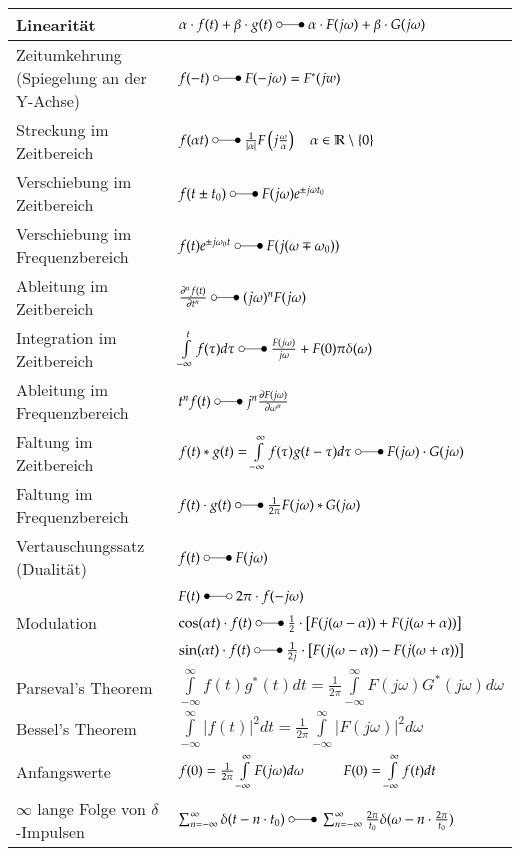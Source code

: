\begin{tabular}{|l|l|}
	\hline
	Linearität & 
	$\alpha\cdot f(t) + \beta\cdot g(t) \;\laplace\;\alpha\cdot F(j\omega) +
	\beta\cdot G(j\omega)$\\
	\hline
	Zeitumkehrung (Spiegelung an der Y-Achse)&
	$f(-t) \;\laplace\; F(-j\omega) = F^*(jw)$ \\
	\hline        	
	Streckung im Zeitbereich &
	$f(\alpha t) \;\laplace\; \frac{1}{|\alpha|}F \left (j\frac{\omega}{\alpha} \right)
	\quad\alpha \in\mathbb{R}\setminus \{0\}$\\
	\hline
	Verschiebung im	Zeitbereich &
	$f(t\pm t_0) \;\laplace\; F(j\omega)e^{\pm j\omega t_0}$\\
	\hline
	Verschiebung im Frequenzbereich &
	$f(t)e^{\pm j\omega_0 t} \;\laplace\; F(j(\omega\mp\omega_0))$\\
	\hline
	Ableitung im Zeitbereich &
	$\frac{\partial^n f(t)}{\partial t^n} \;\laplace\; (j\omega)^n F(j\omega)$\\
	\hline
	Integration im Zeitbereich &
	$\int\limits_{-\infty}^{t}f(\tau)d\tau \;\laplace\;
	\frac{F(j\omega)}{j\omega}+F(0)\pi\delta(\omega)$\\
	\hline				
	Ableitung im Frequenzbereich &
	$t^n f(t) \;\laplace\; j^n \frac{\partial F(j\omega)}{\partial \omega^n}$\\
	\hline		
	Faltung im Zeitbereich &
	$f(t) \ast g(t) = \int\limits_{-\infty}^{\infty} f(\tau)g(t-\tau)d\tau \;\laplace\;
	F(j\omega) \cdot G(j\omega)$\\
	\hline
	Faltung im Frequenzbereich &
	$f(t) \cdot g(t) \;\laplace\; \frac{1}{2\pi}F(j\omega) \ast G(j\omega)$\\
	\hline
	Vertauschungssatz (Dualität) &
	$f(t) \;\laplace\; F(j\omega)\nonumber$ \\
	& $F(t) \;\Laplace\; 2\pi \cdot f(-j\omega)$\\
	\hline
	Modulation &
	$\cos(\alpha t) \cdot f(t)  \;\laplace\;  \frac{1}{2}\cdot
	\left[F(j(\omega-\alpha)) + F(j(\omega+\alpha))\right ]$\\
	& $\sin(\alpha t) \cdot f(t) \;\laplace\; \frac{1}{2j}\cdot \left[
	F(j(\omega-\alpha)) - F(j(\omega+\alpha))\right ]$\\
	\hline
	Parseval's Theorem &
	$\int\limits_{-\infty}^{\infty}f(t)g^{\ast}(t)dt = \frac{1}{2\pi}
	\int\limits_{-\infty}^{\infty}F(j\omega)G^{\ast}(j\omega)d\omega$\\
	\hline
	Bessel's Theorem &
	$\int\limits_{-\infty}^{\infty}|f(t)|^2 dt = \frac{1}{2\pi}
	\int\limits_{-\infty}^{\infty}|F(j\omega)|^2 d\omega$\\
	\hline 			
	Anfangswerte &
	$f(0)=\frac{1}{2\pi}\int\limits_{-\infty}^{\infty}F(j\omega)d\omega
	\hspace*{1cm} F(0)=\int\limits_{-\infty}^{\infty}f(t)dt$\\
	\hline
	$\infty$ lange Folge von $\delta$-Impulsen &
	$\sum_{n=-\infty}^{\infty} \delta(t-n\cdot t_0) \;\laplace\;
	\sum_{n=-\infty}^{\infty} \frac{2\pi}{t_0}\delta(\omega-n\cdot
	\frac{2\pi}{t_0})$\\
	\hline
\end{tabular}

